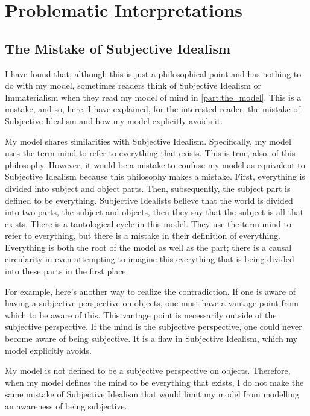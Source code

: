 \chapter{Problematic Interpretations}
\label{chapter:problematic_interpretations}

\section{The Mistake of Subjective Idealism}
\label{section:the_mistake_of_subjective_idealism}

I have found that, although this is just a philosophical point and has
nothing to do with my model, sometimes readers think of Subjective
Idealism or Immaterialism \citep{berkeley:1734} when they read my
model of mind in \autoref{part:the_model}.  This is a mistake, and so,
here, I have explained, for the interested reader, the mistake of
Subjective Idealism and how my model explicitly avoids it.

My model shares similarities with Subjective Idealism.  Specifically,
my model uses the term mind to refer to everything that exists.  This
is true, also, of this philosophy.  However, it would be a mistake to
confuse my model as equivalent to Subjective Idealism because this
philosophy makes a mistake.  First, everything is divided into subject
and object parts.  Then, subsequently, the subject part is defined to
be everything.  Subjective Idealists believe that the world is divided
into two parts, the subject and objects, then they say that the
subject is all that exists.  There is a tautological cycle in this
model.  They use the term mind to refer to everything, but there is a
mistake in their definition of everything.  Everything is both the
root of the model as well as the part; there is a causal circularity
in even attempting to imagine this everything that is being divided
into these parts in the first place.

For example, here's another way to realize the contradiction.  If one
is aware of having a subjective perspective on objects, one must have
a vantage point from which to be aware of this.  This vantage point is
necessarily outside of the subjective perspective.  If the mind is the
subjective perspective, one could never become aware of being
subjective.  It is a flaw in Subjective Idealism, which my model
explicitly avoids.

My model is not defined to be a subjective perspective on objects.
Therefore, when my model defines the mind to be everything that
exists, I do not make the same mistake of Subjective Idealism that
would limit my model from modelling an awareness of being subjective.


